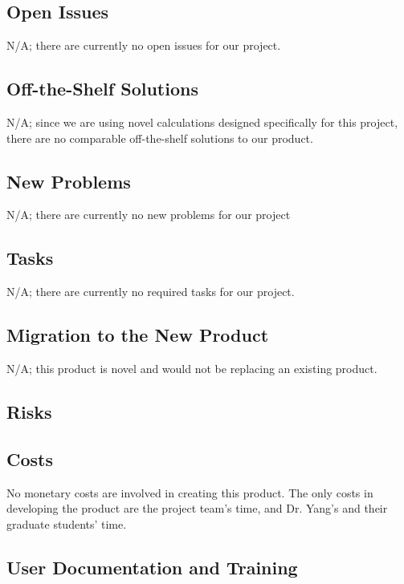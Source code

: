 \documentclass[12pt]{article}
\begin{document}
\subsection{Open Issues}

N/A; there are currently no open issues for our project.

\subsection{Off-the-Shelf Solutions}

N/A; since we are using novel calculations designed specifically for this project, there are no comparable off-the-shelf solutions to our product.

\subsection{New Problems}

N/A; there are currently no new problems for our project

\subsection{Tasks}

N/A; there are currently no required tasks for our project.

\subsection{Migration to the New Product}

N/A; this product is novel and would not be replacing an existing product.

\subsection{Risks}



\subsection{Costs}

No monetary costs are involved in creating this product. The only costs in developing the product are the project team's time, and Dr. Yang's and their graduate students' time.

\subsection{User Documentation and Training}
\end{document}
